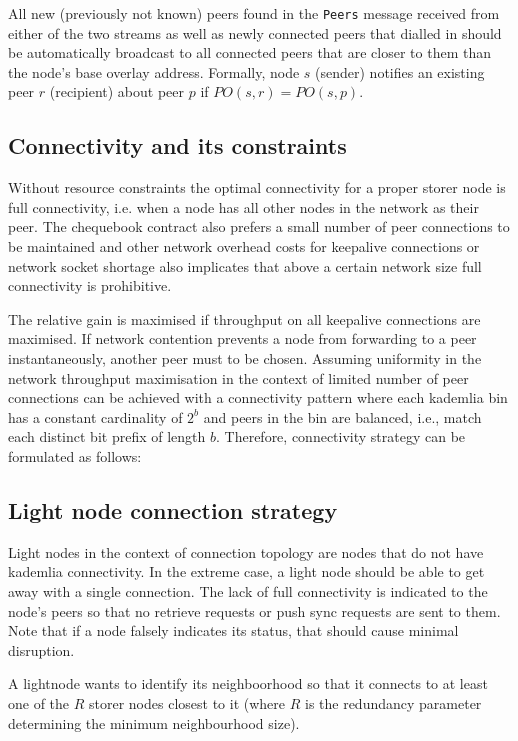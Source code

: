 
All new (previously not known) peers found in the \lstinline{Peers} message received from either of the two streams as well as newly connected peers that dialled in should be automatically broadcast to all connected peers that are closer  to them than the node's base overlay address. Formally, 
node $s$ (sender) notifies an existing peer $r$ (recipient) about peer $p$ if $\mathit{PO}(s, r) = \mathit{PO}(s, p)$. 

\subsection{Connectivity and its constraints}

Without resource constraints the optimal connectivity for a proper storer node is full  connectivity, i.e. when a node has all other nodes in the network as their peer. The chequebook contract also prefers a small number of peer connections to be maintained and other network overhead costs for keepalive connections or network socket shortage also implicates that 
above a certain network size full connectivity is prohibitive.

The relative gain is maximised if throughput on all keepalive connections are maximised. If network contention prevents a node from forwarding to a peer instantaneously, another peer must to be chosen. 
Assuming uniformity in the network 
throughput maximisation in the context of limited number of peer connections can be achieved with a connectivity pattern where each kademlia bin has a constant cardinality of $2^b$ and peers in the bin are balanced, i.e., match each distinct bit prefix of length $b$.
Therefore, connectivity strategy can be formulated as follows:







\subsection{Light node connection strategy}

Light nodes in the context of connection topology are nodes that do not have kademlia connectivity. In the extreme case, a light node should be able to get away with a single connection. The lack of full connectivity is indicated to the node's peers so that no retrieve requests or  push sync requests are sent to them. Note that if a node falsely indicates its status, that should cause minimal disruption. 

A lightnode wants to identify its neighboorhood so that it connects to at least one of the $R$ storer nodes closest to it (where $R$ is the redundancy parameter determining the minimum neighbourhood size).



